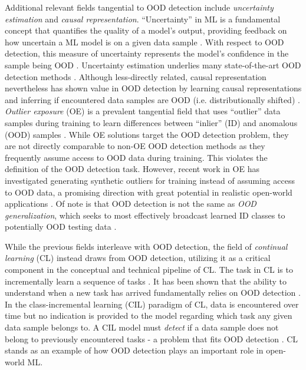 Additional relevant fields tangential to OOD detection include \textit{uncertainty estimation} and \textit{causal representation}. ``Uncertainty'' in ML is a fundamental concept that quantifies the quality of a model's output, providing feedback on how uncertain a ML model is on a given data sample \cite{loquercio2020general,malinin2018predictive,malinin2019reverse}. With respect to OOD detection, this measure of uncertainty represents the model's confidence in the sample being OOD \cite{hendrycks2017baseline}. Uncertainty estimation underlies many state-of-the-art OOD detection methods \cite{hendrycks2017baseline,gal2016dropout,guo2017calibration}. Although less-directly related, causal representation nevertheless has shown value in OOD detection by learning causal representations and inferring if encountered data samples are OOD (i.e. distributionally shifted) \cite{scholkopf2021toward,wang2022causal}. \textit{Outlier exposure} (OE) is a prevalent tangential field that uses ``outlier'' data samples during training to learn differences between ``inlier'' (ID) and anomalous (OOD) samples \cite{hendrycks2018deep,yang2021generalized,chen2021atom,papadopoulos2021outlier,lioutlier,wei2024eat}. While OE solutions target the OOD detection problem, they are not directly comparable to non-OE OOD detection methods as they frequently assume access to OOD data during training. This violates the definition of the OOD detection task. However, recent work in OE has investigated generating synthetic outliers for training instead of assuming access to OOD data, a promising direction with great potential in realistic open-world applications \cite{gong2025out}. Of note is that OOD detection is not the same as \textit{OOD generalization}, which seeks to most effectively broadcast learned ID classes to potentially OOD testing data \cite{zangovercoming,li2023distilling,vogt2023robust}.

While the previous fields interleave with OOD detection, the field of \textit{continual learning} (CL) instead draws from OOD detection, utilizing it as a critical component in the conceptual and technical pipeline of CL. The task in CL is to incrementally learn a sequence of tasks \cite{thrun1995lifelong,hadsell2020embracing,chen2018lifelong}. It has been shown that the ability to understand when a new task has arrived fundamentally relies on OOD detection \cite{kim2022theoretical}. In the class-incremental learning (CIL) paradigm of CL, data is encountered over time but no indication is provided to the model regarding which task any given data sample belongs to. A CIL model must \emph{detect} if a data sample does not belong to previously encountered tasks - a problem that fits OOD detection \cite{kim2022multi,kim2023learnability}. CL stands as an example of how OOD detection plays an important role in open-world ML.

